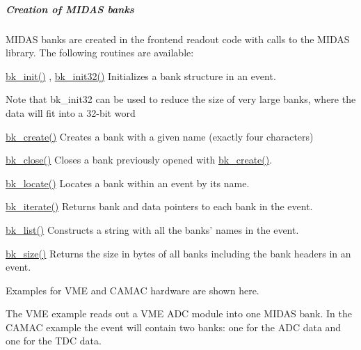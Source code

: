  \label{FE_bank_construction_idx_Midas_bank}
\hypertarget{FE_bank_construction_idx_Midas_bank}{}
 \hypertarget{FE_bank_construction_FE_creation_Midas_banks}{}\subparagraph{Creation of MIDAS banks}\label{FE_bank_construction_FE_creation_Midas_banks}
MIDAS banks are created in the frontend readout code with calls to the MIDAS library. The following routines are available:
\begin{DoxyItemize}
\item \hyperlink{group__bkfunctionc_gac6fadde40824dbf7bd70abedd29be2bd}{bk\_\-init()} , \hyperlink{group__bkfunctionc_gae7cbf587db63fcdf66dd18b29f08b6d2}{bk\_\-init32()} Initializes a bank structure in an event. \par
Note that bk\_\-init32 can be used to reduce the size of very large banks, where the data will fit into a 32-\/bit word
\item \hyperlink{group__bkfunctionc_ga4bb781187e18834136ed8ac368d53413}{bk\_\-create()} Creates a bank with a given name (exactly four characters)
\item \hyperlink{group__bkfunctionc_ga132dc71c8f74b478cdcc59bc1d9f6a26}{bk\_\-close()} Closes a bank previously opened with \hyperlink{group__bkfunctionc_ga4bb781187e18834136ed8ac368d53413}{bk\_\-create()}.
\item \hyperlink{group__bkfunctionc_gafe085ddb11bdcff4ca461224254289ef}{bk\_\-locate()} Locates a bank within an event by its name.
\item \hyperlink{group__bkfunctionc_gab6012589013da85b128d8443501a4a44}{bk\_\-iterate()} Returns bank and data pointers to each bank in the event.
\item \hyperlink{group__bkfunctionc_ga4d8a0ef23239ae478544fa96a0e98a33}{bk\_\-list()} Constructs a string with all the banks' names in the event.
\item \hyperlink{group__bkfunctionc_ga8fc93de36e62c4328cb6581be7f42a0f}{bk\_\-size()} Returns the size in bytes of all banks including the bank headers in an event.
\end{DoxyItemize}

\par
 Examples for VME and CAMAC hardware are shown here.

The VME example reads out a VME ADC module into one MIDAS bank. In the CAMAC example the event will contain two banks: one for the ADC data and one for the TDC data.

